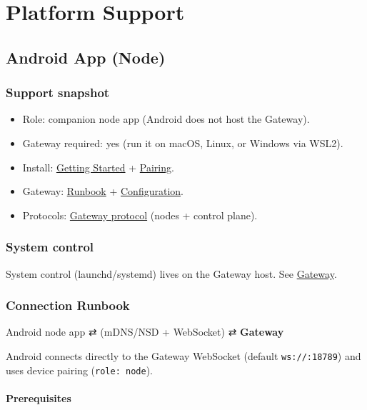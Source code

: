 \chapter{Platform Support}

\section{Android App (Node)}


\subsection{Support snapshot}


\begin{itemize}
  \item Role: companion node app (Android does not host the Gateway).
  \item Gateway required: yes (run it on macOS, Linux, or Windows via WSL2).
  \item Install: \href{/start/getting-started}{Getting Started} + \href{/channels/pairing}{Pairing}.
  \item Gateway: \href{/gateway}{Runbook} + \href{/gateway/configuration}{Configuration}.
  \item Protocols: \href{/gateway/protocol}{Gateway protocol} (nodes + control plane).
\end{itemize}


\subsection{System control}


System control (launchd/systemd) lives on the Gateway host. See \href{/gateway}{Gateway}.

\subsection{Connection Runbook}


Android node app ⇄ (mDNS/NSD + WebSocket) ⇄ \textbf{Gateway}

Android connects directly to the Gateway WebSocket (default \texttt{ws://:18789}) and uses device pairing (\texttt{role: node}).

\subsubsection{Prerequisites}


